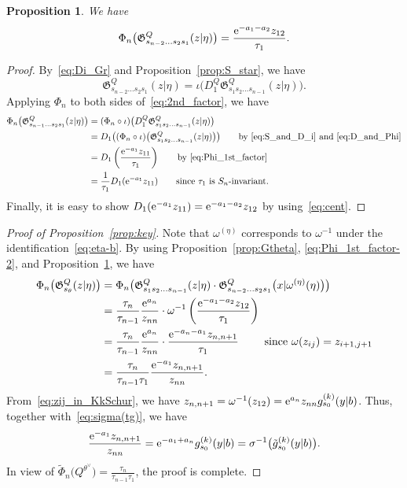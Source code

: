 \documentclass[10pt,a4paper]{amsart}
\numberwithin{equation}{section}
\newcommand{\Gro}[1]{\mathfrak{G}^Q_{#1}}
\newtheorem{Proposition}[Theorem]{Proposition}
\theoremstyle{definition}
\begin{document}
\begin{Proposition}\label{prop:Phi_n_2nd_factor}
We have
\[%
\Phi_n\bigl(\Gro{s_{n-2}\dots s_2s_{1}}(z|\eta)\bigr)=\frac{{\rm e}^{-a_1-a_2}z_{12}}{\tau_1}.
\]
\end{Proposition}
\begin{proof}
By~\eqref{eq:Di_Gr} and Proposition~\ref{prop:S_star}, we have
\begin{equation}
\Gro{s_{n-2}\dots s_2s_{1}}(z|\eta)
=
\iota\bigl(D_1^{Q}\Gro{s_{1}s_2\dots s_{n-1}}(z|\eta)\bigr).\label{eq:2nd_factor}
\end{equation}
Applying
${\Phi}_n$ to both sides of~\eqref{eq:2nd_factor}, we have
\begin{align*}
\Phi_n\bigl(\Gro{s_{n-1}\dots s_2s_{1}}(z|\eta)\bigr)
&=(\Phi_n\circ \iota)\bigl(D_1^{Q}\Gro{s_{1}s_2\dots s_{n-1}}(z|\eta)\bigr) \\
&=
D_1\bigl(
(\Phi_n\circ \iota)\bigl(\Gro{s_{1}s_2\dots s_{n-1}}(z|\eta)\bigr)
\bigr)\qquad\text{by~\eqref{eq:S_and_D_i} and~\eqref{eq:D_and_Phi}}\\
&=D_1\left(
\frac{{\rm e}^{-a_1}z_{11}}{\tau_1}
\right)\qquad \text{by
\eqref{eq:Phi_1st_factor}}\\
&=
\frac{1}{\tau_1}
D_1({{\rm e}^{-a_1}z_{11}})
\qquad \text{since $\tau_1$ is $S_n$-invariant.}
\end{align*}
Finally, it is easy to show
$D_1({\rm e}^{-a_1}z_{11})={{\rm e}^{-a_1-a_2}z_{12}}$
by using~\eqref{eq:cent}.
\end{proof}

\begin{proof}[Proof of Proposition~\ref{prop:key}]
Note that $\omega^{(\eta)}$ corresponds to $\omega^{-1}$
under the identification~\eqref{eq:eta-b}.
By using Proposition~\ref{prop:Gtheta}, \eqref{eq:Phi_1st_factor-2}, and
Proposition~\ref{prop:Phi_n_2nd_factor}, we have
\begin{align*}
\Phi_n
\bigl(\Gro{s_{\theta}}(z|\eta)\bigr)
&=
\Phi_n
\bigl(\Gro{s_1s_2\dots s_{n-1}}(z|\eta)\cdot \Gro{s_{n-2}\dots s_2s_1}\bigl(x|\omega^{(\eta)}(\eta)\bigr)
\bigr)\\
&=
\frac{\tau_n}{\tau_{n-1}}
\frac{{\rm e}^{a_n}}{z_{nn}}
\cdot
\omega^{-1}
\left(
\frac{{\rm e}^{-a_1-a_2}z_{12}}{\tau_1}
\right)\\
&=
\frac{\tau_n}{\tau_{n-1}}
\frac{{\rm e}^{a_n}}{z_{nn}}
\cdot
\frac{{\rm e}^{-a_n-a_1}z_{n,n+1}}{\tau_1}
\qquad\text{
since $\omega(z_{ij})=z_{i+1,j+1}$}
\\
&=
\frac{\tau_n}{\tau_{n-1}\tau_1}
\frac{{\rm e}^{-a_1}z_{n,n+1}}{z_{nn}}.
\end{align*}
From~\eqref{eq:zij_in_KkSchur},
we have
$z_{n,n+1}=\omega^{-1}(z_{12})={\rm e}^{a_n}z_{nn}g_{s_0}^{(k)}(y|b)$.
Thus, together with~\eqref{eq:sigma(tg)}, we have
\[
\frac{{\rm e}^{-a_1}z_{n,n+1}}{z_{nn}}
={\rm e}^{-a_1+a_n}g_{s_0}^{(k)}(y|b)
=\sigma^{-1}\bigl(\tilde{g}_{s_0}^{(k)}(y|b)\bigr).
\]
In view of
$
\tilde{\Phi}_n\bigl(Q^{\theta^\vee}\bigr)=
\frac{\tau_n}{\tau_{n-1}\tau_1}$,
the proof is complete.
\end{proof}
\end{document}
